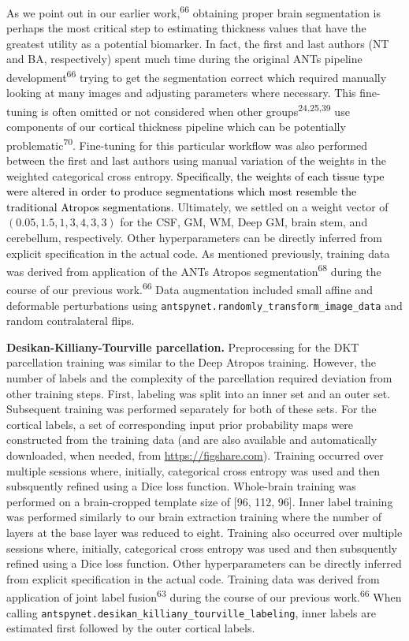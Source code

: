 \documentclass[
  12pt,
]{article}
\begin{document}
As we point out in our earlier work,\textsuperscript{66} obtaining
proper brain segmentation is perhaps the most critical step to
estimating thickness values that have the greatest utility as a
potential biomarker. In fact, the first and last authors (NT and BA,
respectively) spent much time during the original ANTs pipeline
development\textsuperscript{66} trying to get the segmentation correct
which required manually looking at many images and adjusting parameters
where necessary. This fine-tuning is often omitted or not considered
when other groups\textsuperscript{24,25,39} use components of our
cortical thickness pipeline which can be potentially
problematic\textsuperscript{70}. Fine-tuning for this particular
workflow was also performed between the first and last authors using
manual variation of the weights in the weighted categorical cross
entropy.
\textcolor{black}{Specifically, the weights of each tissue type were altered in
order to produce segmentations which most resemble the traditional Atropos segmentations.}
Ultimately, we settled on a weight vector of
\((0.05, 1.5, 1, 3, 4, 3, 3)\) for the CSF, GM, WM, Deep GM, brain stem,
and cerebellum, respectively. Other hyperparameters can be directly
inferred from explicit specification in the actual code. As mentioned
previously, training data was derived from application of the ANTs
Atropos segmentation\textsuperscript{68} during the course of our
previous work.\textsuperscript{66} Data augmentation included small
affine and deformable perturbations using
\texttt{antspynet.randomly\_transform\_image\_data} and random
contralateral flips.

\textbf{Desikan-Killiany-Tourville parcellation.} Preprocessing for the
DKT parcellation training was similar to the Deep Atropos training.
However, the number of labels and the complexity of the parcellation
required deviation from other training steps. First, labeling was split
into an inner set and an outer set. Subsequent training was performed
separately for both of these sets. For the cortical labels, a set of
corresponding input prior probability maps were constructed from the
training data (and are also available and automatically downloaded, when
needed, from \url{https://figshare.com}). Training occurred over
multiple sessions where, initially, categorical cross entropy was used
and then subsquently refined using a Dice loss function. Whole-brain
training was performed on a brain-cropped template size of {[}96, 112,
96{]}. Inner label training was performed similarly to our brain
extraction training where the number of layers at the base layer was
reduced to eight. Training also occurred over multiple sessions where,
initially, categorical cross entropy was used and then subsquently
refined using a Dice loss function. Other hyperparameters can be
directly inferred from explicit specification in the actual code.
Training data was derived from application of joint label
fusion\textsuperscript{63} during the course of our previous
work.\textsuperscript{66} When calling
\texttt{antspynet.desikan\_killiany\_tourville\_labeling}, inner labels
are estimated first followed by the outer cortical labels.
\end{document}
